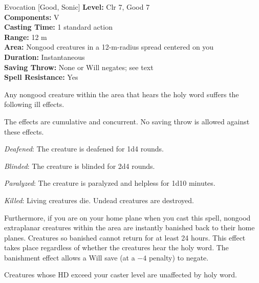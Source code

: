 {Evocation [Good, Sonic]}
{
	\textbf{Level:}
	Clr 7, Good 7\\
	\textbf{Components:}
	V\\
	\textbf{Casting Time:}
	1 standard action\\
	\textbf{Range:}
	12 m\\
	\textbf{Area:}
	Nongood creatures in a 12-m-radius spread centered on you\\
	\textbf{Duration:}
	Instantaneous\\
	\textbf{Saving Throw:}
	None or Will negates; see text\\
	\textbf{Spell Resistance:}
	Yes\\
}
{
	Any nongood creature within the area that hears the holy word suffers the following ill effects.


	The effects are cumulative and concurrent. No saving throw is allowed against these effects.

	\textit{Deafened}:
	The creature is deafened for 1d4 rounds.

	\textit{Blinded}:
	The creature is blinded for 2d4 rounds.

	\textit{Paralyzed}:
	The creature is paralyzed and helpless for 1d10 minutes.

	\textit{Killed}:
	Living creatures die. Undead creatures are destroyed.

	Furthermore, if you are on your home plane when you cast this spell, nongood extraplanar creatures within the area are instantly banished back to their home planes. Creatures so banished cannot return for at least 24 hours. This effect takes place regardless of whether the creatures hear the holy word. The banishment effect allows a Will save (at a $-4$ penalty) to negate.

	Creatures whose HD exceed your caster level are unaffected by holy word.

}
